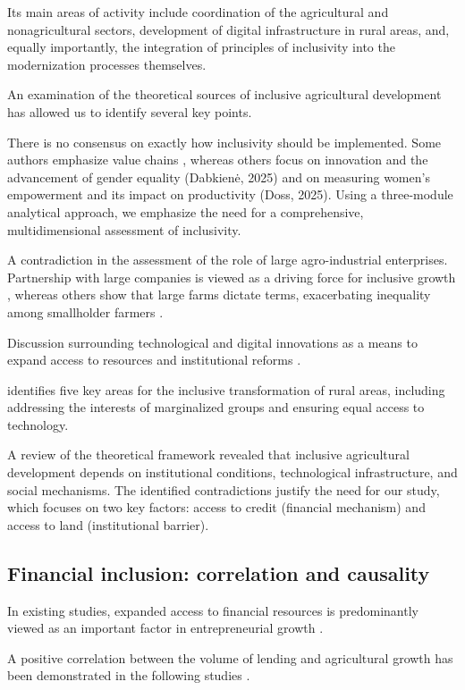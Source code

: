 ﻿\documentclass[pdflatex,sn-mathphys-ay]{sn-jnl}
\begin{document}
Its main areas of activity include coordination of the agricultural and
nonagricultural sectors, development of digital infrastructure in rural
areas, and, equally importantly, the integration of principles of
inclusivity into the modernization processes themselves.

An examination of the theoretical sources of inclusive agricultural
development has allowed us to identify several key points.

There is no consensus on exactly how inclusivity should be implemented.
Some authors emphasize value chains \citep{ref81}, whereas
others focus on innovation and the advancement of gender equality
(Dabkienė, 2025) and on measuring women's empowerment and its impact on
productivity (Doss, 2025). Using a three-module analytical approach, we
emphasize the need for a comprehensive, multidimensional assessment of
inclusivity.

A contradiction in the assessment of the role of large agro-industrial
enterprises. Partnership with large
companies is viewed as a driving force for inclusive growth
\citep{ref34}, whereas others show that large farms dictate terms,
exacerbating inequality among smallholder farmers \citep{ref90}.

Discussion surrounding technological and digital innovations as a means
to expand access to resources \citep{ref105,ref43,ref37} and
institutional reforms \citep{ref28}.

\citet{ref55} identifies five key areas for the inclusive
transformation of rural areas, including addressing the interests of
marginalized groups and ensuring equal access to technology.

A review of the theoretical framework revealed that inclusive
agricultural development depends on institutional conditions,
technological infrastructure, and social mechanisms. The identified
contradictions justify the need for our study, which focuses on two key
factors: access to credit (financial mechanism) and access to land
(institutional barrier).

\subsection{Financial inclusion: correlation and causality}

In existing studies, expanded access to financial resources is
predominantly viewed as an important factor in entrepreneurial growth
\citep{ref103}.

A positive correlation between the volume of lending and agricultural
growth has been demonstrated in the following studies
\citep{ref94,ref99,ref70,ref49,ref95,ref97,ref61}.
\end{document}
